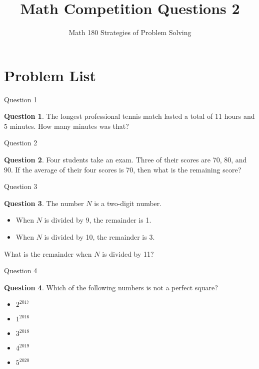 \documentclass[handout]{beamer}
\title{Math Competition Questions 2}
\subtitle
{Math 180 Strategies of Problem Solving}
\author[W.R. Casper] %
{}%
\institute[California State University Fullerton] %
{
  Department of Mathematics\\
  California State University Fullerton}
\theoremstyle{definition}
\newtheorem{quest}{Question}
\begin{document}
\begin{frame}
  \titlepage
\end{frame}





\section{Problem List}
\begin{frame}{Question 1}
\begin{quest}
The longest professional tennis match lasted a total of 11 hours and 5 minutes.  How many minutes was that?
\end{quest}
\end{frame}

\begin{frame}{Question 2}
\begin{quest}
Four students take an exam.  Three of their scores are 70, 80, and 90.  If the average of their four scores is 70, then what is the remaining score?
\end{quest}
\end{frame}

\begin{frame}{Question 3}
\begin{quest}
The number $N$ is a two-digit number.
\begin{itemize}
\item When $N$ is divided by 9, the remainder is 1.
\item When $N$ is divided by 10, the remainder is 3.
\end{itemize}
What is the remainder when $N$ is divided by 11?
\end{quest}

\end{frame}

\begin{frame}{Question 4}
\begin{quest}
Which of the following numbers is not a perfect square?
\begin{itemize}
\item $2^{2017}$
\item $1^{2016}$
\item $3^{2018}$
\item $4^{2019}$
\item $5^{2020}$
\end{itemize}
\end{quest}

\end{frame}
\end{document}
